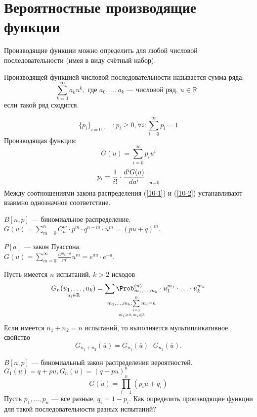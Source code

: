 \section{Вероятностные производящие функции}
Производящие функции можно определить для любой числовой последовательности (имея в виду счётный набор).
\begin{definition}
  Производящей функцией числовой последовательности называется сумма ряда:
  \[ \sum\limits_{k=0}^\infty a_k u^k, \text{ где $a_0, \dots, a_k$ --- числовой ряд, $u \in \mathbb{R}$ }\]
  если такой ряд сходится.
\end{definition}
\[
  {\{p_i\}}_{i = 0, 1, \dots} : p_i \geqslant 0, \forall i : \sum\limits_{i=0}^\infty p_i = 1
\]
\setcounter{equation}{0}
Производящая функция:
\begin{equation}\label{10-1}
  G(u) = \sum\limits_{i = 0}^\infty p_i u^i
\end{equation}
\begin{equation}\label{10-2}
  p_i = \frac{1}{i!} \cdot \frac{d^{\textit{i}} G(u)}{d u^i} \Bigm |_{u = 0}
\end{equation}
Между соотношениями закона распределения (\ref{10-1}) и (\ref{10-2}) устанавливают взаимно однозначное соответствие.
\begin{example}
  $B[n, p]$ --- биномиальное распределение. \\ $G(u) = \sum\limits_{m=0}^n C_n^m \cdot p^m \cdot q^{n-m} \cdot u^m = (pu + q)^m$.
\end{example}
\begin{example}
  $P[a]$ --- закон Пуассона. \\ $G(u) = \sum\limits_{m=0}^\infty \frac{a^m e^{-a}}{m!} u^m = e^{au} \cdot e^{-a}$.
\end{example}
Пусть имеется $n$ испытаний, $k > 2$ исходов
\[
  \underset{u_i \in \mathbb{R}}{G_n(u_1, \dots, u_k)} = \underset{ \underset{m_i \geqslant 0, m_i \in \mathbb{Z}}{m_1, \dots, m_k : \sum\limits_{i=1}^k m_i = n}} {\sum \Prob_{m_1, \dots, m_k}^{(n)}} \cdot u_1^{m_1} \cdot \ldots \cdot u_k^{m_k}
\]
Если имеется $n_1 + n_2 = n$ испытаний, то выполняется мультипликативное свойство
\[
  G_{n_1 + n_2} (\overline{u}) = G_{n_1} (\overline{u}) \cdot G_{n_2} (\overline{u}).
\]
\begin{example}
  $B[n, p]$ --- биномиальный закон распределения вероятностей. \\
  $G_1(u) = q + pu, G_n(u) = (q + pu)^n$\\
  \[
    G(u) = \prod\limits_{i=1}^n (p_i u + q_i)
  \]
Пусть $p_1, \dots, p_n$ --- все разные, $q_i = 1 - p_i$. Как определить производящие функции для такой последовательности разных испытаний?
\end{example}
